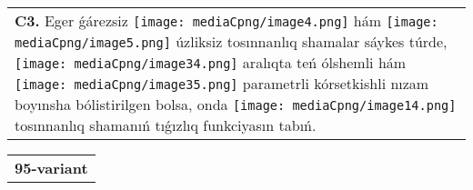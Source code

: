 \documentclass{article}
\begin{document}
\begin{tabular}{m{17cm}}
 \\
\textbf{C3.} Eger ǵárezsiz \texttt{[image: mediaCpng/image4.png]} hám \texttt{[image: mediaCpng/image5.png]} úzliksiz tosınnanlıq shamalar sáykes túrde, \texttt{[image: mediaCpng/image34.png]} aralıqta teń ólshemli hám \texttt{[image: mediaCpng/image35.png]} parametrli kórsetkishli nızam boyınsha bólistirilgen bolsa, onda \texttt{[image: mediaCpng/image14.png]} tosınnanlıq shamanıń tıǵızlıq funkciyasın tabıń.
 \\

\end{tabular}
\vspace{1cm}


\begin{tabular}{m{17cm}}
\textbf{95-variant}
\newline


\end{tabular}
\end{document}
